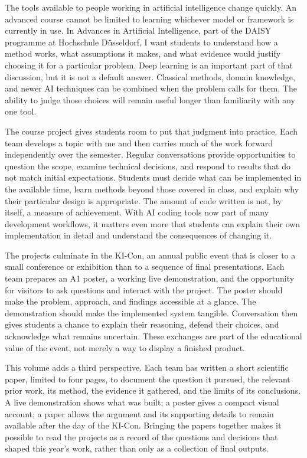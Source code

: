 The tools available to people working in artificial intelligence change
quickly. An advanced course cannot be limited to learning whichever model or
framework is currently in use. In Advances in Artificial Intelligence,
part of the DAISY programme at Hochschule Düsseldorf, I want students to
understand how a method works, what assumptions it makes, and what evidence
would justify choosing it for a particular problem. Deep learning is an
important part of that discussion, but it is not a default answer. Classical
methods, domain knowledge, and newer AI techniques can be combined when the
problem calls for them. The ability to judge those choices will remain useful
longer than familiarity with any one tool.

The course project gives students room to put that judgment into practice.
Each team develops a topic with me and then carries much of the work forward
independently over the semester. Regular conversations provide opportunities
to question the scope, examine technical decisions, and respond to results
that do not match initial expectations. Students must decide what can be
implemented in the available time, learn methods beyond those covered in
class, and explain why their particular design is appropriate. The amount of
code written is not, by itself, a measure of achievement. With AI coding
tools now part of many development workflows, it matters even more that
students can explain their own implementation in detail and understand the
consequences of changing it.

The projects culminate in the KI-Con, an annual public event that is
closer to a small conference or exhibition than to a sequence of final
presentations. Each team prepares an A1 poster, a working live demonstration,
and the opportunity for visitors to ask questions and interact with the
project. The poster should make the problem, approach, and findings accessible
at a glance. The demonstration should make the implemented system tangible.
Conversation then gives students a chance to explain their reasoning, defend
their choices, and acknowledge what remains uncertain. These exchanges are
part of the educational value of the event, not merely a way to display a
finished product.

This volume adds a third perspective. Each team has written a short
scientific paper, limited to four pages, to document the question it pursued,
the relevant prior work, its method, the evidence it gathered, and the limits
of its conclusions. A live demonstration shows what was built; a poster gives
a compact visual account; a paper allows the argument and its supporting
details to remain available after the day of the KI-Con. Bringing the papers
together makes it possible to read the projects as a record of the questions
and decisions that shaped this year's work, rather than only as a collection
of final outputs.

